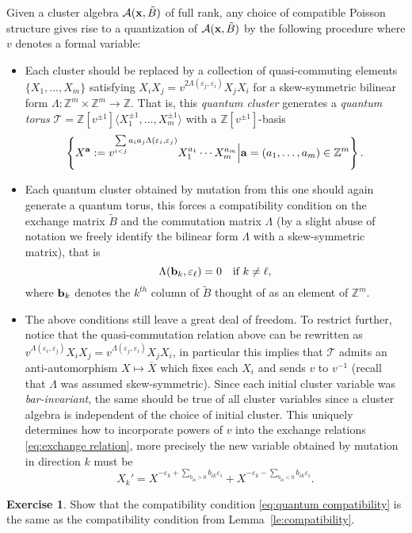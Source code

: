\documentclass{amsart}
\theoremstyle{definition}
\newtheorem{exercise}[theorem]{Exercise}
\theoremstyle{remark}
\numberwithin{equation}{section}
\newcommand{\cA}{{\mathcal{A}}}
\newcommand{\cT}{{\mathcal{T}}}
\newcommand{\ba}{{\bf a}}
\newcommand{\bb}{{\bf b}}
\newcommand{\bx}{{\bf x}}
\newcommand{\ZZ}{{\mathbb{Z}}}
\begin{document}
  Given a cluster algebra $\cA(\bx,\tilde B)$ of full rank, any choice of compatible Poisson structure gives rise to a quantization of $\cA(\bx,\tilde B)$ by the following procedure where $v$ denotes a formal variable:
  \begin{itemize}
    \item Each cluster should be replaced by a collection of quasi-commuting elements $\{X_1,\ldots,X_m\}$ satisfying $X_iX_j=v^{2\Lambda(\varepsilon_j,\varepsilon_i)}X_jX_i$ for a skew-symmetric bilinear form $\Lambda:\ZZ^m\times\ZZ^m\to\ZZ$.  That is, this \emph{quantum cluster} generates a \emph{quantum torus} $\cT=\ZZ[v^{\pm1}]\langle X_1^{\pm1},\ldots,X_m^{\pm1}\rangle$ with a $\ZZ[v^{\pm1}]$-basis 
    \[\left\{X^\ba:=v^{\sum\limits_{i<j}a_ia_j\Lambda(\varepsilon_i,\varepsilon_j)}X_1^{a_1}\cdots X_m^{a_m}\Big|\ba=(a_1,\ldots,a_m)\in\ZZ^m\right\}.\]
    \item Each quantum cluster obtained by mutation from this one should again generate a quantum torus, this forces a compatibility condition on the exchange matrix $\tilde B$ and the commutation matrix $\Lambda$ (by a slight abuse of notation we freely identify the bilinear form $\Lambda$ with a skew-symmetric matrix), that is 
    \begin{equation}\label{eq:quantum compatibility}
      \Lambda(\bb_k,\varepsilon_\ell)=0\quad\text{if $k\ne\ell$,}
    \end{equation}
    where $\bb_k$ denotes the $k^{th}$ column of $\tilde B$ thought of as an element of $\ZZ^m$.
    \item The above conditions still leave a great deal of freedom.  To restrict further, notice that the quasi-commutation relation above can be rewritten as $v^{\Lambda(\varepsilon_i,\varepsilon_j)}X_iX_j=v^{\Lambda(\varepsilon_j,\varepsilon_i)}X_jX_i$, in particular this implies that $\cT$ admits an anti-automorphism $X\mapsto \overline{X}$ which fixes each $X_i$ and sends $v$ to $v^{-1}$ (recall that $\Lambda$ was assumed skew-symmetric).  Since each initial cluster variable was \emph{bar-invariant}, the same should be true of all cluster variables since a cluster algebra is independent of the choice of initial cluster.  This uniquely determines how to incorporate powers of $v$ into the exchange relations \eqref{eq:exchange relation}, more precisely the new variable obtained by mutation in direction $k$ must be
    \[X_k'=X^{-\varepsilon_k+\sum\limits_{b_{ik}>0}b_{ik}\varepsilon_i}+X^{-\varepsilon_k-\sum\limits_{b_{ik}<0}b_{ik}\varepsilon_i}.\]
  \end{itemize}
  \begin{exercise}
    Show that the compatibility condition \eqref{eq:quantum compatibility} is the same as the compatibility condition from Lemma~\ref{le:compatibility}.
  \end{exercise}
\end{document}
